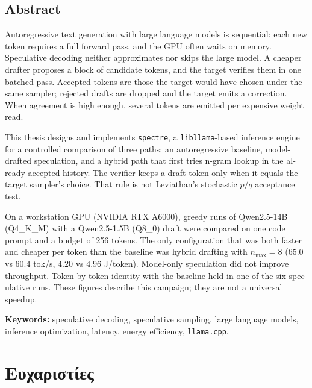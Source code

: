 \documentclass[a4paper,12pt]{report}
\theoremstyle{plain}
\theoremstyle{definition}
\theoremstyle{remark}
\begin{document}
\begin{otherlanguage}{english}
  \chapter*{Abstract}

  Autoregressive text generation with large language models is sequential: each
  new token requires a full forward pass, and the GPU often waits on memory.
  Speculative decoding neither approximates nor skips the large model. A cheaper
  drafter proposes a block of candidate tokens, and the target verifies them in
  one batched pass. Accepted tokens are those the target would have chosen under
  the same sampler; rejected drafts are dropped and the target emits a
  correction. When agreement is high enough, several tokens are emitted per
  expensive weight read.

  This thesis designs and implements \texttt{spectre}, a \texttt{libllama}-based
  inference engine for a controlled comparison of three paths: an autoregressive
  baseline, model-drafted speculation, and a hybrid path that first tries
  n-gram lookup in the already accepted history. The verifier keeps a draft
  token only when it equals the target sampler's choice. That rule is not
  Leviathan's stochastic \(p/q\) acceptance test.

  On a workstation GPU (NVIDIA RTX A6000), greedy runs of Qwen2.5-14B
  (Q4\_K\_M) with a Qwen2.5-1.5B (Q8\_0) draft were compared on one code prompt
  and a budget of 256 tokens. The only configuration that was both faster and
  cheaper per token than the baseline was hybrid drafting with \(n_{\max}=8\)
  (\(65.0\) vs \(60.4\) tok/s, \(4.20\) vs \(4.96\) J/token). Model-only
  speculation did not improve throughput. Token-by-token identity with the
  baseline held in one of the six speculative runs. These figures describe this
  campaign; they are not a universal speedup.

  \vspace{1.5em}
  \noindent\textbf{Keywords:}
  speculative decoding, speculative sampling, large language models,
  inference optimization, latency, energy efficiency, \texttt{llama.cpp}.
\end{otherlanguage}

\chapter*{Ευχαριστίες}
\end{document}
